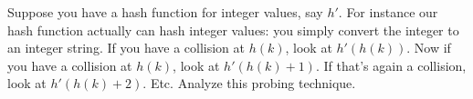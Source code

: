Suppose you have a hash function for integer values, say $h'$.
For instance our hash function
actually can hash integer values: you simply convert the 
integer to an integer string. 
If you have a collision at $h(k)$, look at $h'(h(k))$.
Now if you have a collision at $h(k)$, look at $h'(h(k) + 1)$.
If that's again a collision, look at $h'(h(k) + 2)$.
Etc.
Analyze this probing technique.
